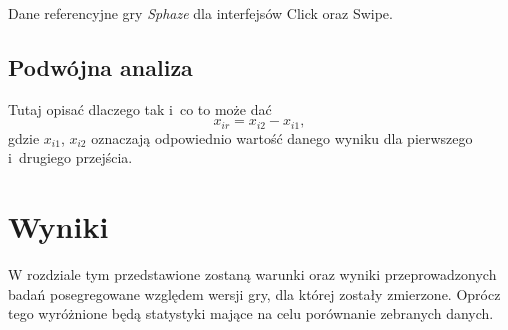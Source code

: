 \documentclass[a4paper,12pt,numbers=noenddot]{report}
\begin{document}
\begin{table}[H]
  \centering
  
  \caption{Dane referencyjne gry \textit{Sphaze} dla interfejsów Click oraz Swipe.}
	
  \label{tab:ref_data}%
\end{table}%

\section{Podwójna analiza}
Tutaj opisać dlaczego tak i~co to może dać
\begin{equation}
\label{eq_relative}
x_{ir} = x_{i2} - x_{i1},
\end{equation}
gdzie $x_{i1}$, $x_{i2}$ oznaczają odpowiednio wartość danego wyniku dla pierwszego i~drugiego przejścia.


\chapter{Wyniki}
W rozdziale tym przedstawione zostaną warunki oraz wyniki przeprowadzonych badań posegregowane względem wersji gry, dla której zostały zmierzone. Oprócz tego wyróżnione będą statystyki mające na celu porównanie zebranych danych.
\end{document}

